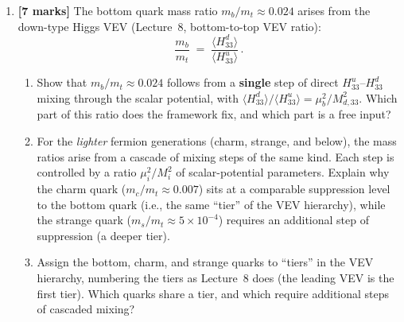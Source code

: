 \documentclass[11pt,a4paper]{article}
\begin{document}
\begin{enumerate}[label=(\alph*)]
\begin{enumerate}[label=(\roman*)]
      \item For $\Lambda_D = 10^{11}\;\text{GeV}$,
        $M_{\text{Pl}} = 1.22 \times 10^{19}\;\text{GeV}$ and
        $\Lambda_S = 3\;\text{TeV}$, evaluate this suppression factor
        numerically.  Compare it with the observed mass ratios $m_b/m_t
        \approx 0.024$, $m_c/m_t \approx 0.007$, and $m_s/m_t
        \approx 5 \times 10^{-4}$.  Comment on whether one mixing step
        is in the right ballpark.  What would the suppression be if the
        dormant doublets sat at the duality scale instead,
        $M_i^2 \sim \Lambda_D^2$?
    \end{enumerate}

  \item \textbf{[7 marks]}
    The bottom quark mass ratio $m_b/m_t \approx 0.024$ arises from the
    down-type Higgs VEV (Lecture~8, bottom-to-top VEV ratio):
    \begin{equation}\label{eq:bottom-ratio-prob}
      \frac{m_b}{m_t}
      \;=\; \frac{\langle H_{33}^d \rangle}{\langle H_{33}^u \rangle}\,.
    \end{equation}

    \begin{enumerate}[label=(\roman*)]
      \item Show that $m_b/m_t \approx 0.024$ follows from a
        \textbf{single} step of direct $H_{33}^u$--$H_{33}^d$ mixing
        through the scalar potential, with
        $\langle H_{33}^d\rangle/\langle H_{33}^u\rangle
        = \mu_b^2/M_{d,33}^2$.  Which part of this ratio does the
        framework fix, and which part is a free input?

      \item For the \emph{lighter} fermion generations (charm, strange,
        and below), the mass ratios arise from a cascade of mixing
        steps of the same kind.  Each step is controlled by a ratio
        $\mu_i^2/M_i^2$ of scalar-potential parameters.  Explain
        why the charm quark ($m_c/m_t \approx 0.007$) sits at a
        comparable suppression level to the bottom quark (i.e., the
        same ``tier'' of the VEV hierarchy), while the strange quark
        ($m_s/m_t \approx 5 \times 10^{-4}$) requires an additional
        step of suppression (a deeper tier).

      \item Assign the bottom, charm, and strange quarks to
        ``tiers'' in the VEV hierarchy, numbering the tiers as
        Lecture~8 does (the leading VEV is the first tier).  Which
        quarks share a tier, and which require additional steps of
        cascaded mixing?
    \end{enumerate}


\end{enumerate}
\end{document}
